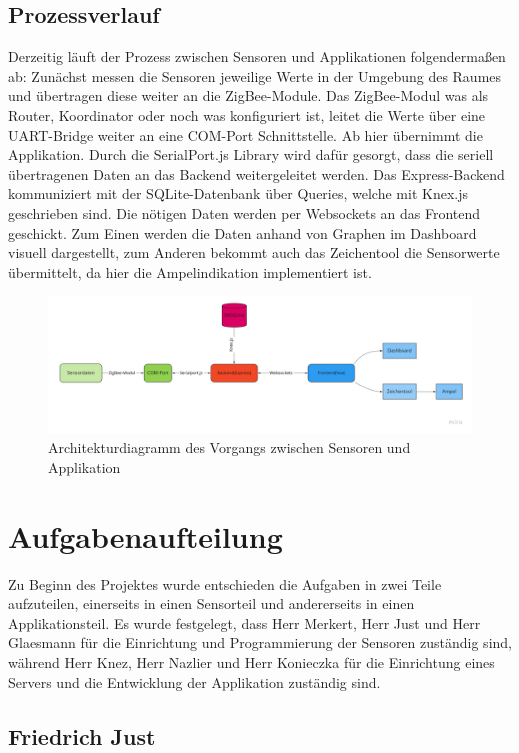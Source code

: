 \documentclass[]{article}
\begin{document}
	\subsection{Prozessverlauf}
	Derzeitig läuft der Prozess zwischen Sensoren und Applikationen folgendermaßen ab:\newline
	Zunächst messen die Sensoren jeweilige Werte in der Umgebung des Raumes und übertragen diese weiter an die ZigBee-Module. Das ZigBee-Modul was als Router, Koordinator oder noch was konfiguriert ist, leitet die Werte über eine UART-Bridge weiter an eine COM-Port Schnittstelle. Ab hier übernimmt die Applikation. Durch die SerialPort.js Library wird dafür gesorgt, dass die seriell übertragenen Daten an das Backend weitergeleitet werden. Das Express-Backend kommuniziert mit der SQLite-Datenbank über Queries, welche mit Knex.js geschrieben sind. Die nötigen Daten werden per Websockets an das Frontend geschickt. %
	Zum Einen werden die Daten anhand von Graphen im Dashboard visuell dargestellt, zum Anderen bekommt auch das Zeichentool die Sensorwerte übermittelt, da hier die Ampelindikation implementiert ist. 
	\begin{figure}[!h]
		\centering
		\includegraphics[scale=0.223]{images/DocArchitectureDiagram}
		\caption{Architekturdiagramm des Vorgangs zwischen Sensoren und Applikation}
		\label{img:DocArchitectureDiagram}
	\end{figure}
	\newpage
	\section{Aufgabenaufteilung} %
	Zu Beginn des Projektes wurde entschieden die Aufgaben in zwei Teile aufzuteilen, einerseits in einen Sensorteil und andererseits in einen Applikationsteil. Es wurde festgelegt, dass Herr Merkert, Herr Just und Herr Glaesmann für die Einrichtung und Programmierung der Sensoren zuständig sind, während Herr Knez, Herr Nazlier und Herr Konieczka für die Einrichtung eines Servers und die Entwicklung der Applikation zuständig sind. 
		\subsection{Friedrich Just}
\end{document}
